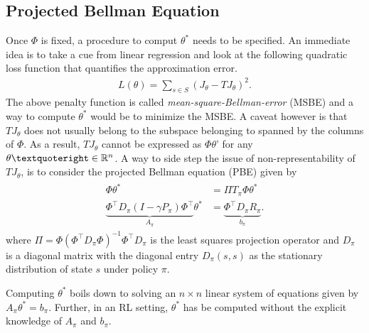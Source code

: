 \subsection{Projected Bellman Equation}
Once $\Phi$ is fixed, a procedure to comput $\theta^*$ needs to be specified. An immediate idea is to take a cue from linear regression and look at the following quadratic loss function that quantifies the approximation error.
\begin{align}
L(\theta)=\sum_{s\in S}(J_\theta-TJ_\theta)^2.
\end{align}
The above penalty function is called \emph{mean-square-Bellman-error} (MSBE) and a way to compute $\theta^*$ would be to minimize the MSBE. A caveat however is that $TJ_\theta$ does not usually belong to the subspace belonging to spanned by the columns of $\Phi$. As a result, $TJ_\theta$ cannot be expressed as $\Phi \theta’$ for any $\theta’\in \R^n$. 
A way to side step the issue of non-representability of $TJ_\theta$, is to consider the projected Bellman equation (PBE) given by
\begin{align}\label{pbe}
\begin{split}
\Phi {\theta^*}&=\Pi T_\pi \Phi{\theta^*}\\
\underbrace{\Phi^\top D_\pi (I-\gamma P_\pi)\Phi^\top}_{A_\pi} \theta^*&=\underbrace{\Phi^\top D_\pi R_\pi}_{b_\pi}.
\end{split}
\end{align}
where $\Pi=\Phi(\Phi^\top D_\pi \Phi)^{-1}\Phi^\top D_\pi$ is the least squares projection operator and $D_\pi$ is a diagonal matrix with the diagonal entry $D_\pi(s,s)$ as the stationary distribution of state $s$ under policy $\pi$.\par
Computing $\theta^*$ boils down to solving an $n\times n $ linear system of equations given by$A_\pi\theta^*=b_\pi$. Further, in an RL setting, $\theta^*$ has be computed without the explicit knowledge of $A_\pi$ and $b_\pi$.
